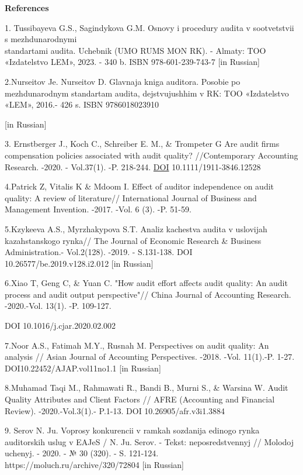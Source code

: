 \begin{center}
  {\bfseries References}
\end{center}
  
\begin{references}

1. Tussibayeva G.S., Sagindykova G.M. Osnovy i procedury audita v
sootvetstvii s mezhdunarodnymi \\standartami audita. Uchebnik (UMO RUMS
MON RK). - Almaty: TOO «Izdatel\textquotesingle stvo LEM», 2023. - 340
b. ISBN 978-601-239-743-7 {[}in Russian{]}

2.Nurseitov Je. Nurseitov D. Glavnaja kniga auditora. Posobie po
mezhdunarodnym standartam audita, dejstvujushhim v RK: TOO
«Izdatel\textquotesingle stvo «LEM», 2016.- 426 s. ISBN 9786018023910

{[}in Russian{]}

3. Ernstberger J., Koch C., Schreiber E. M., \& Trompeter G Are audit
firms\textquotesingle{} compensation policies associated with audit
quality? //Contemporary Accounting Research. -2020. - Vol.37(1). -P.
218-244. \href{https://DOI/}{DOI} 10.1111/1911-3846.12528

4.Patrick Z, Vitalis K \& Mdoom I. Effect of auditor independence on
audit quality: A review of literature// International Journal of
Business and Management Invention. -2017. -Vol. 6 (3). -P. 51-59.

5.Kzykeeva A.S., Myrzhakypova S.T. Analiz kachestva audita v uslovijah
kazahstanskogo rynka// The Journal of Economic Research \& Business
Administration.- Vol.2(128). -2019. - S.131-138. DOI
\\10.26577/be.2019.v128.i2.012 {[}in Russian{]}

6.Xiao T, Geng C, \& Yuan C. "How audit effort affects audit quality: An
audit process and audit output perspective"// China Journal of
Accounting Research. -2020.-Vol. 13(1). -P. 109-127.

DOI 10.1016/j.cjar.2020.02.002

7.Noor A.S., Fatimah M.Y., Rusnah M. Perspectives on audit quality: An
analysis // Asian Journal of Accounting Perspectives. -2018. -Vol.
11(1).-P. 1-27. DOI10.22452/AJAP.vol11no1.1 {[}in Russian{]}

8.Muhamad Taqi M., Rahmawati R., Bandi B., Murni S., \& Warsina W. Audit
Quality Attributes and Client Factors // AFRE (Accounting and Financial
Review). -2020.-Vol.3(1).- P.1-13. DOI 10.26905/afr.v3i1.3884

9. Serov N. Ju. Voprosy konkurencii v ramkah sozdanija edinogo rynka
auditorskih uslug v EAJeS / N. Ju. Serov. - Tekst: neposredstvennyj //
Molodoj uchenyj. - 2020. - № 30 (320). - S. 121-124.
\\https://moluch.ru/archive/320/72804 {[}in Russian{]}


\end{references}
